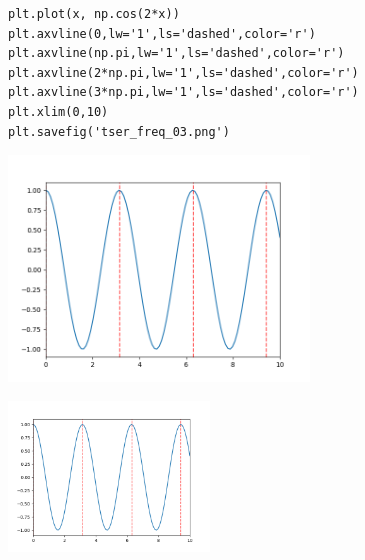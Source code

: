 \documentclass[12pt,fleqn]{article}\usepackage{../../common}
\begin{document}
\begin{verbatim}
plt.plot(x, np.cos(2*x))
plt.axvline(0,lw='1',ls='dashed',color='r')
plt.axvline(np.pi,lw='1',ls='dashed',color='r')
plt.axvline(2*np.pi,lw='1',ls='dashed',color='r')
plt.axvline(3*np.pi,lw='1',ls='dashed',color='r')
plt.xlim(0,10)
plt.savefig('tser_freq_03.png')
\end{verbatim}

\includegraphics[height=6cm]{tser_freq_03.png}

\includegraphics[height=4cm]{tser_freq_03.png}
\end{document}
